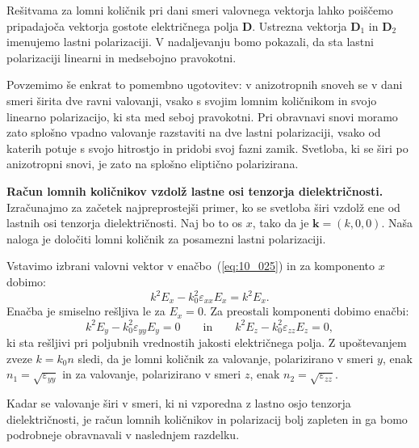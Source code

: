 Rešitvama za lomni količnik pri dani smeri valovnega 
vektorja lahko poiščemo pripadajoča vektorja gostote električnega polja
$\mathbf{D}$. Ustrezna vektorja $\mathbf{D}_{1}$ in $\mathbf{D}_{2}$ 
imenujemo lastni polarizaciji. V nadaljevanju bomo pokazali, da sta 
lastni polarizaciji linearni in medsebojno pravokotni.

Povzemimo še enkrat to pomembno ugotovitev: v anizotropnih snoveh se v dani smeri
širita dve ravni valovanji, vsako s svojim lomnim količnikom 
in svojo linearno polarizacijo, ki sta med seboj pravokotni. Pri obravnavi snovi
moramo zato splošno vpadno valovanje razstaviti na dve lastni polarizaciji, vsako 
od katerih potuje s svojo hitrostjo in pridobi svoj fazni zamik. Svetloba, ki
se širi po anizotropni snovi, je zato na splošno eliptično polarizirana.

\begin{example}{\bf Račun lomnih količnikov vzdolž lastne osi tenzorja dielektričnosti.}
Izračunajmo za začetek najpreprostejši primer, ko se svetloba širi vzdolž ene od
lastnih osi tenzorja dielektričnosti. Naj bo to os $x$, tako da je $\mathbf{k} = 
(k,0,0)$. Naša naloga je določiti lomni količnik za posamezni lastni polarizaciji.

Vstavimo izbrani valovni vektor v enačbo~(\ref{eq:10_025}) in za komponento $x$ dobimo:
\begin{equation}
k^2 E_x - k_0^2 \varepsilon_{xx}E_x = k^2 E_x.
\label{eq:10_035}
\end{equation}
Enačba je smiselno rešljiva le za $E_x = 0$. Za preostali komponenti dobimo enačbi:
\begin{equation}
k^2 E_y - k_0^2 \varepsilon_{yy}E_y = 0 \qquad \mathrm{in} \qquad k^2 E_z - k_0^2 \varepsilon_{zz}E_z = 0,
\label{eq:10_036}
\end{equation}
ki sta rešljivi pri poljubnih vrednostih jakosti električnega polja. 
Z upoštevanjem zveze $k = k_0 n$ sledi, da je lomni količnik za 
valovanje, polarizirano v smeri $y$, enak $n_1 = \sqrt{\varepsilon_{yy}}$ in 
za valovanje, polarizirano v smeri $z$, enak $n_2 = \sqrt{\varepsilon_{zz}}$. 

Kadar se valovanje širi v smeri, ki ni vzporedna z lastno osjo tenzorja
dielektričnosti, je račun lomnih količnikov in polarizacij bolj zapleten in 
ga bomo podrobneje obravnavali v naslednjem razdelku.
\end{example}

